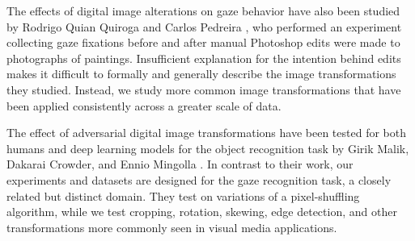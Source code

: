 The effects of digital image alterations on gaze behavior have also been studied by Rodrigo Quian Quiroga and Carlos Pedreira \cite{quianquiroga}, who performed an experiment collecting gaze fixations before and after manual Photoshop edits were made to photographs of paintings. Insufficient explanation for the intention behind edits makes it difficult to formally and generally describe the image transformations they studied. Instead, we study more common image transformations that have been applied consistently across a greater scale of data.

The effect of adversarial digital image transformations have been tested for both humans and deep learning models for the object recognition task by Girik Malik, Dakarai Crowder, and Ennio Mingolla \cite{object-recognition-transforms}. In contrast to their work, our experiments and datasets are designed for the gaze recognition task, a closely related but distinct domain. They test on variations of a pixel-shuffling algorithm, while we test cropping, rotation, skewing, edge detection, and other transformations more commonly seen in visual media applications.
